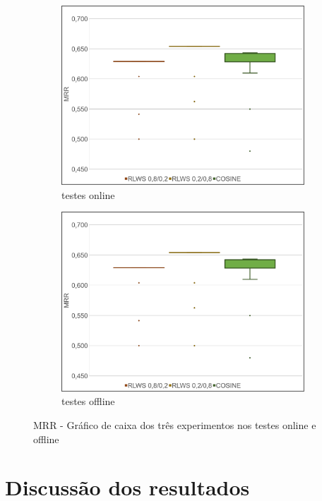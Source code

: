\begin{figure}
    \begin{subfigure}{.5\textwidth}
        \centering
        \includegraphics[width=.8\linewidth]{imagens/mrr_box_plot.jpg}
        \caption{testes online}
        \label{fig:mrr_box_plot_a}
    \end{subfigure}%
    \begin{subfigure}{.5\textwidth}
        \centering
        \includegraphics[width=.8\linewidth]{imagens/mrr_box_plot.jpg}
        \caption{testes offline}
        \label{fig:mrr_box_plot_b}
    \end{subfigure}
    \caption{MRR - Gráfico de caixa dos três experimentos nos testes online e offline}
    \label{fig:mrr_box_plot}
\end{figure}

\section{Discussão dos resultados}
